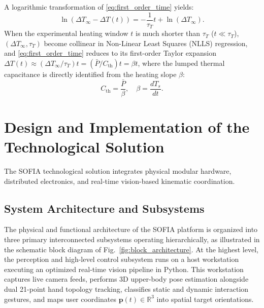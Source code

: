 \documentclass[lettersize,journal]{IEEEtran}
\begin{document}
	A logarithmic transformation of \eqref{eq:first_order_time} yields:
	\begin{equation}
		\ln\left(\Delta T_\infty - \Delta T(t)\right) = -\frac{1}{\tau_T}t + \ln(\Delta T_\infty).
		\label{eq:linearized_thermal}
	\end{equation}
	When the experimental heating window $t$ is much shorter than $\tau_T$ ($t \ll \tau_T$), $(\Delta T_\infty, \tau_T)$ become collinear in Non-Linear Least Squares (NLLS) regression, and \eqref{eq:first_order_time} reduces to its first-order Taylor expansion $\Delta T(t) \approx (\Delta T_\infty / \tau_T)t = (\bar{P} / C_{\text{th}})t = \beta t$, where the lumped thermal capacitance is directly identified from the heating slope $\beta$:
	\begin{equation}
		C_{\text{th}} = \frac{\bar{P}}{\beta}, \quad \beta = \frac{dT_s}{dt}.
		\label{eq:thermal_parameters}
	\end{equation}
	
	
	
	\section{Design and Implementation of the Technological Solution}
	\label{sec:design}
	
	The SOFIA technological solution integrates physical modular hardware, distributed electronics, and real-time vision-based kinematic coordination.
	
	\subsection{System Architecture and Subsystems}
	\label{sec:system_architecture}
	
	The physical and functional architecture of the SOFIA platform is organized into three primary interconnected subsystems operating hierarchically, as illustrated in the schematic block diagram of Fig.~\ref{fig:block_architecture}. At the highest level, the perception and high-level control subsystem runs on a host workstation executing an optimized real-time vision pipeline in Python. This workstation captures live camera feeds, performs 3D upper-body pose estimation alongside dual 21-point hand topology tracking, classifies static and dynamic interaction gestures, and maps user coordinates $\mathbf{p}(t) \in \mathbb{R}^3$ into spatial target orientations.
	
\end{document}
